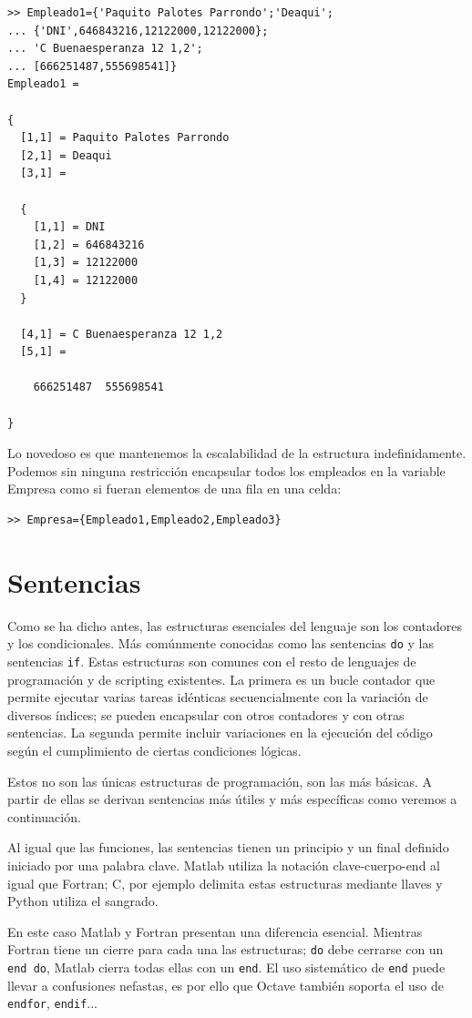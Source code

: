 \begin{verbatim}
>> Empleado1={'Paquito Palotes Parrondo';'Deaqui';
... {'DNI',646843216,12122000,12122000};
... 'C Buenaesperanza 12 1,2';
... [666251487,555698541]}
Empleado1 =

{
  [1,1] = Paquito Palotes Parrondo
  [2,1] = Deaqui
  [3,1] =

  {
    [1,1] = DNI
    [1,2] = 646843216
    [1,3] = 12122000
    [1,4] = 12122000
  }

  [4,1] = C Buenaesperanza 12 1,2
  [5,1] =

    666251487  555698541

}
\end{verbatim}
Lo novedoso es que mantenemos la escalabilidad de la estructura
indefinidamente.  Podemos sin ninguna restricción encapsular todos
los empleados en la variable Empresa como si fueran elementos de
una fila en una celda:

\begin{verbatim}
>> Empresa={Empleado1,Empleado2,Empleado3}
\end{verbatim}

\section{Sentencias}

Como se ha dicho antes, las estructuras esenciales del lenguaje son
los contadores y los condicionales. Más comúnmente conocidas como las
sentencias \texttt{do} y las sentencias \texttt{if}. Estas estructuras
son comunes con el resto de lenguajes de programación y de scripting
existentes. La primera es un bucle contador que permite ejecutar
varias tareas idénticas secuencialmente con la variación de diversos
índices; se pueden encapsular con otros contadores y con otras
sentencias.  La segunda permite incluir variaciones en la ejecución
del código según el cumplimiento de ciertas condiciones lógicas.

Estos no son las únicas estructuras de programación, son las más
básicas.  A partir de ellas se derivan sentencias más útiles y más
específicas como veremos a continuación.

Al igual que las funciones, las sentencias tienen un principio y un
final definido iniciado por una palabra clave.  Matlab utiliza la
notación clave-cuerpo-end al igual que Fortran; C, por ejemplo
delimita estas estructuras mediante llaves y Python utiliza el
sangrado.

En este caso Matlab y Fortran presentan una diferencia esencial.
Mientras Fortran tiene un cierre para cada una las estructuras;
\texttt{do} debe cerrarse con un \texttt{end do}, Matlab cierra todas
ellas con un \texttt{end}.  El uso sistemático de \texttt{end} puede
llevar a confusiones nefastas, es por ello que Octave también soporta
el uso de \texttt{endfor}, \texttt{endif}...

